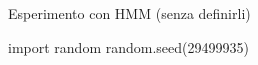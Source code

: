 \documentclass[11pt,twoside,a4paper]{article}
\newcounter{quesito}
\newenvironment{question}{\bigskip\addtocounter{quesito}{1}\bigskip\bigskip\par\textbf{Quesito \thequesito.\kern0ex}}{\par\vspace{\parskip}}
\begin{document}
\colorbox{blue!10}{\begin{minipage}{\textwidth}
Esperimento con HMM (senza definirli)

\end{minipage}}

\bigskip\bigskip


\begin{pycode}
import random
random.seed(29499935)
\end{pycode}


% 
% 
% 
% 
% 
%  
\end{document}

